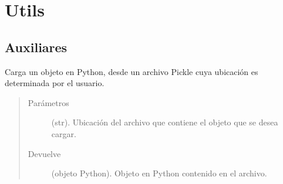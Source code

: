 \documentclass[letterpaper,10pt,openany,spanish]{sphinxmanual}
\begin{document}
\chapter{Utils}
\label{\detokenize{funciones/utils:utils}}\label{\detokenize{funciones/utils::doc}}

\section{Auxiliares}
\label{\detokenize{funciones/utils:module-utils.auxiliares}}\label{\detokenize{funciones/utils:auxiliares}}

\begin{fulllineitems}
\label{\detokenize{funciones/utils:utils.auxiliares.cargar_objeto}}
Carga un objeto en Python, desde un archivo Pickle cuya ubicación es determinada por el usuario.
\begin{quote}\begin{description}
\item[{Parámetros}] \leavevmode
{} \textendash{} (str). Ubicación del archivo que contiene el objeto que se desea cargar.

\item[{Devuelve}] \leavevmode
(objeto Python). Objeto en Python contenido en el archivo.

\end{description}\end{quote}

\end{fulllineitems}

\end{document}
